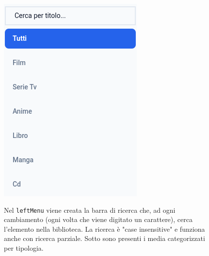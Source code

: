 \documentclass[a4paper,12pt]{article}
\begin{document}
\begin{figure}[ht!]
    \centering
    \begin{minipage}{0.4\textwidth}
        \includegraphics[width=\linewidth]{img/LeftMenu.png}
    \end{minipage}\hfill
    \begin{minipage}{0.55\textwidth}
        \small
        Nel \texttt{leftMenu} viene creata la barra di ricerca che, ad ogni cambiamento (ogni volta che viene digitato un carattere), cerca l'elemento nella biblioteca.\newline
        La ricerca è "case insensitive" e funziona anche con ricerca parziale. Sotto sono presenti i media categorizzati per tipologia.
    \end{minipage}
\end{figure}
\end{document}
